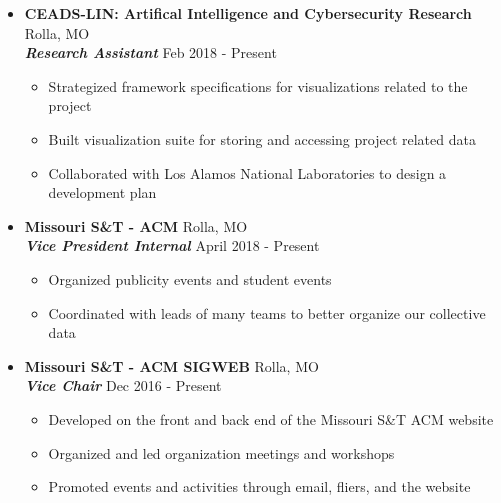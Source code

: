 \documentclass[9pt,oneside]{memoir}
\begin{document}
\begin{itemize}
    \item[] \textbf{CEADS-LIN: Artifical Intelligence and Cybersecurity Research}
		\hfill Rolla, MO\\
		\textit{\textbf{Research Assistant}}
		\hfill Feb 2018 - Present
		\begin{itemize}
		    \item[\textbullet] Strategized framework specifications for visualizations related to the project
		    \item[\textbullet] Built visualization suite for storing and accessing project related data
			\item[\textbullet] Collaborated with Los Alamos National Laboratories to design a development plan
		\end{itemize}
		
	\item[] \textbf{Missouri S\&T - ACM}
	    \hfill Rolla, MO\\
	    \textit{\textbf{Vice President Internal}}
	    \hfill April 2018 - Present
	    \begin{itemize}
	        \item[\textbullet] Organized publicity events and student events
	        \item[\textbullet] Coordinated with leads of many teams to better organize our collective data
	    \end{itemize}
		
	\item[] \textbf{Missouri S\&T - ACM SIGWEB}
		\hfill Rolla, MO\\
		\textit{\textbf{Vice Chair}}
		\hfill Dec 2016 - Present
		\begin{itemize}
			\item[\textbullet] Developed on the front and back end of the Missouri S\&T ACM website
			\item[\textbullet] Organized and led organization meetings and workshops
			\item[\textbullet] Promoted events and activities through email, fliers, and the website
		\end{itemize}
\end{itemize}


\vspace*{-16pt}
\end{document}
